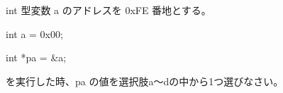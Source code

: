 int 型変数 a のアドレスを 0xFE 番地とする。\par
\noindent int a = 0x00; \par
\noindent int *pa = \&a; \par
を実行した時、pa の値を選択肢a〜dの中から1つ選びなさい。
